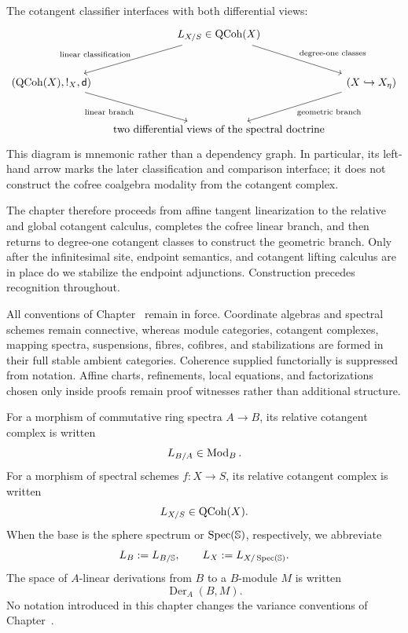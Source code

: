 The cotangent classifier interfaces with both differential views:
\[
\begin{tikzcd}[column sep=small,row sep=large]
& L_{X/S}\in\QCoh(X)
    \arrow[dl, "{\text{linear classification}}"']
    \arrow[dr, "{\text{degree-one classes}}"]
& \\
(\QCoh(X),!_X,\mathsf d)
    \arrow[dr, "{\text{linear branch}}"']
&&
(X\hookrightarrow X_\eta)
    \arrow[dl, "{\text{geometric branch}}"]
\\
& \text{two differential views of the spectral doctrine} &
\end{tikzcd}
\]
This diagram is mnemonic rather than a dependency graph. In particular, its
left-hand arrow marks the later classification and comparison interface; it
does not construct the cofree coalgebra modality from the cotangent complex.

The chapter therefore proceeds from affine tangent linearization to the
relative and global cotangent calculus, completes the cofree linear branch,
and then returns to degree-one cotangent classes to construct the geometric
branch. Only after the infinitesimal site, endpoint semantics, and cotangent
lifting calculus are in place do we stabilize the endpoint adjunctions.
Construction precedes recognition throughout.

All conventions of Chapter~ remain in
force. Coordinate algebras and spectral schemes remain connective, whereas
module categories, cotangent complexes, mapping spectra, suspensions, fibres,
cofibres, and stabilizations are formed in their full stable ambient
categories. Coherence supplied functorially is suppressed from notation.
Affine charts, refinements, local equations, and factorizations chosen only
inside proofs remain proof witnesses rather than additional structure.

\begin{convention}
\label{conv:deformation-relative-notation}
For a morphism of commutative ring spectra \(A\to B\), its relative cotangent
complex is written
\[
    L_{B/A}\in\operatorname{Mod}_B.
\]
For a morphism of spectral schemes \(f:X\to S\), its relative cotangent
complex is written
\[
    L_{X/S}\in\operatorname{QCoh}(X).
\]
When the base is the sphere spectrum or \(\operatorname{Spec}(\mathbb S)\), respectively,
we abbreviate
\[
    L_B:=L_{B/\mathbb S},
    \qquad
    L_X:=L_{X/\operatorname{Spec}(\mathbb S)}.
\]
The space of \(A\)-linear derivations from \(B\) to a \(B\)-module \(M\) is
written
\[
    \operatorname{Der}_A(B,M).
\]
No notation introduced in this chapter changes the variance conventions of
Chapter~.
\end{convention}

